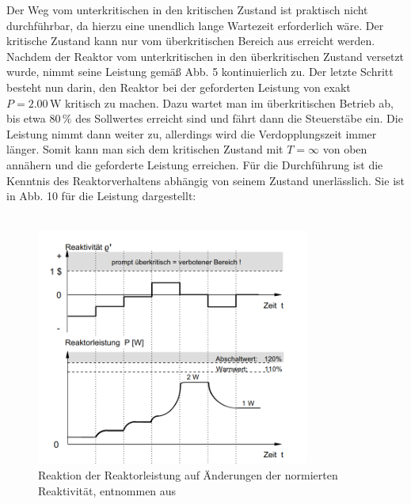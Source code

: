\documentclass[german,  %
parskip=full,  %
]{scrartcl}
\begin{document}
\newpage
Der Weg vom unterkritischen in den kritischen Zustand ist praktisch nicht durchführbar, da hierzu eine unendlich lange Wartezeit erforderlich wäre. Der kritische Zustand kann nur vom überkritischen Bereich aus erreicht werden.
Nachdem der Reaktor vom unterkritischen in den überkritischen Zustand versetzt wurde, nimmt seine Leistung gemäß Abb. 5 kontinuierlich zu. Der letzte Schritt besteht nun darin, den Reaktor bei der geforderten Leistung von exakt \(P=2.00\,\mathrm{W}\) kritisch zu machen. Dazu wartet man im überkritischen Betrieb ab, bis etwa \(80\,\%\) des Sollwertes erreicht sind und fährt dann die Steuerstäbe ein. Die Leistung nimmt dann weiter zu, allerdings wird die Verdopplungszeit immer länger. Somit kann man sich dem kritischen Zustand mit \(T=\infty\) von oben annähern und die geforderte Leistung erreichen. Für die Durchführung ist die Kenntnis des Reaktorverhaltens abhängig von seinem Zustand unerlässlich. Sie ist in Abb. 10 für die Leistung dargestellt: \\\\
\begin{figure}[h!]\centering
\includegraphics[width=0.8\textwidth]{Reaktion_des_Reaktors.png}
\caption{Reaktion der Reaktorleistung auf Änderungen der normierten Reaktivität, entnommen aus \cite{1}}
\end{figure}
\\\\
\end{document}
